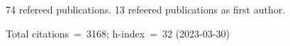 74 refereed publications. 13 refeered publications as first author.

Total citations~=~3168; h-index~=~32 (2023-03-30)